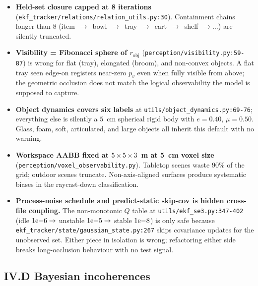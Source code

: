 \documentclass[11pt]{article}
\begin{document}
\begin{itemize}[leftmargin=1.5em,itemsep=0pt,topsep=2pt]
  adjacent items 5~cm apart in clutter survive arbitrarily.
\item \textbf{Held-set closure capped at 8 iterations}
  (\texttt{ekf\_tracker/relations/relation\_utils.py:30}). Containment
  chains longer than 8 (item~$\to$~bowl~$\to$~tray~$\to$~cart~$\to$~shelf~$\to\ldots$)
  are silently truncated.
\item \textbf{Visibility = Fibonacci sphere of $r_{\text{obj}}$}
  (\texttt{perception/visibility.py:59-87}) is wrong for flat (tray),
  elongated (broom), and non-convex objects. A flat tray seen edge-on
  registers near-zero $p_v$ even when fully visible from above; the
  geometric occlusion does not match the logical observability the model
  is supposed to capture.
\item \textbf{Object dynamics covers six labels} at
  \texttt{utils/object\_dynamics.py:69-76}; everything else is silently a
  $5$~cm spherical rigid body with $e{=}0.40,\,\mu{=}0.50$. Glass, foam,
  soft, articulated, and large objects all inherit this default with no
  warning.
\item \textbf{Workspace AABB fixed at $5\times 5\times 3$~m at 5~cm voxel
  size} (\texttt{perception/voxel\_observability.py}). Tabletop scenes
  waste 90\% of the grid; outdoor scenes truncate. Non-axis-aligned
  surfaces produce systematic biases in the raycast-down classification.
\item \textbf{Process-noise schedule and predict-static skip-cov is hidden
  cross-file coupling.} The non-monotonic $Q$ table at
  \texttt{utils/ekf\_se3.py:347-402} (idle $1{\rm e}{-}6\to$ unstable
  $1{\rm e}{-}5\to$ stable $1{\rm e}{-}8$) is only safe because
  \texttt{ekf\_tracker/state/gaussian\_state.py:267} skips covariance
  updates for the unobserved set. Either piece in isolation is wrong;
  refactoring either side breaks long-occlusion behaviour with no test
  signal.
\end{itemize}

\subsection*{IV.D Bayesian incoherences}
\end{document}
